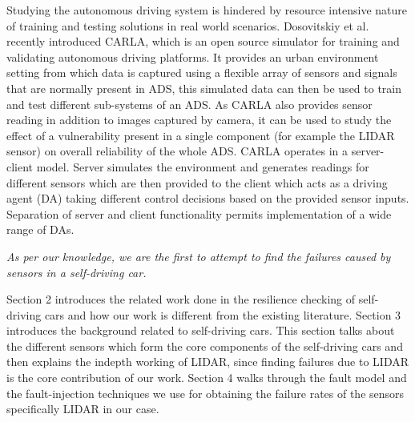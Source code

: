 Studying the autonomous driving system is hindered by resource intensive nature of training and testing solutions in real world scenarios. Dosovitskiy et al.~\cite{carla18corl} recently introduced CARLA, which is an open source simulator for training and validating autonomous driving platforms. It provides an urban environment setting from which data is captured using a flexible array of sensors and signals that are normally present in ADS, this simulated data can then be used to train and test different sub-systems of an ADS. As CARLA also provides sensor reading in addition to images captured by camera, it can be used to study the effect of a vulnerability present in a single component (for example the LIDAR sensor) on overall reliability of the whole ADS. CARLA operates in a server-client model. Server simulates the environment and generates readings for different sensors which are then provided to the client which acts as a driving agent (DA) taking different control decisions based on the provided sensor inputs. Separation of server and client functionality permits implementation of a wide range of DAs.

\emph{As per our knowledge, we are the first to attempt to find the failures caused by sensors in a self-driving car.}

Section 2 introduces the related work done in the resilience checking of self-driving cars and how our work is different from the existing literature. Section 3 introduces the background related to self-driving cars. This section talks about the different sensors which form the core components of the self-driving cars and then explains the indepth working of LIDAR, since finding failures due to LIDAR is the core contribution of our work.  Section 4 walks through the fault model and the fault-injection techniques we use for obtaining the failure rates of the sensors specifically LIDAR in our case. 